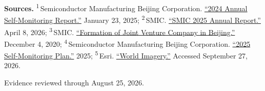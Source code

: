 \begin{minipage}[t][0.90\textheight][t]{\textwidth}
{\sffamily\scriptsize\setlength{\emergencystretch}{1.5em}\textbf{Sources.} \textsuperscript{1}\,Semiconductor Manufacturing Beijing Corporation. \href{\detokenize{https://www.smics.com/uploads/6795f77a/}\%\detokenize{26e8}\%\detokenize{2687}\%\detokenize{26aa}\%\detokenize{26e8}\%\detokenize{26a1}\%\detokenize{268c}\%\detokenize{26e7}\%\detokenize{269b}\%\detokenize{2691}\%\detokenize{26e6}\%\detokenize{26b5}\%\detokenize{268b}\%\detokenize{26e5}\%\detokenize{26b9}\%\detokenize{26b4}\%\detokenize{26e5}\%\detokenize{26ba}\%\detokenize{26a6}\%\detokenize{26e6}\%\detokenize{268a}\%\detokenize{26a5}\%\detokenize{26e5}\%\detokenize{2691}\%\detokenize{268a2024}\%\detokenize{26e5}\%\detokenize{26b9}\%\detokenize{26b4.pdf}}{\enquote{2024 Annual Self-Monitoring Report.}} January 23, 2025; \textsuperscript{2}\,SMIC. \href{\detokenize{https://www1.hkexnews.hk/listedco/listconews/sehk/2026/0408/2026040801181.pdf}}{\enquote{SMIC 2025 Annual Report.}} April 8, 2026; \textsuperscript{3}\,SMIC. \href{\detokenize{https://www1.hkexnews.hk/listedco/listconews/sehk/2020/1204/2020120401701.pdf}}{\enquote{Formation of Joint Venture Company in Beijing.}} December 4, 2020; \textsuperscript{4}\,Semiconductor Manufacturing Beijing Corporation. \href{\detokenize{https://www.smics.com/uploads/2025}\%\detokenize{26e5}\%\detokenize{26b9}\%\detokenize{26b4}\%\detokenize{26e8}\%\detokenize{2687}\%\detokenize{26aa}\%\detokenize{26e8}\%\detokenize{26a1}\%\detokenize{268c}\%\detokenize{26e7}\%\detokenize{269b}\%\detokenize{2691}\%\detokenize{26e6}\%\detokenize{26b5}\%\detokenize{268b}\%\detokenize{26e6}\%\detokenize{2696}\%\detokenize{26b9}\%\detokenize{26e6}\%\detokenize{26a1}\%\detokenize{2688.pdf}}{\enquote{2025 Self-Monitoring Plan.}} 2025; \textsuperscript{5}\,Esri. \href{\detokenize{https://www.arcgis.com/home/item.html?id=10df2279f9684e4a9f6a7f08febac2a9}}{\enquote{World Imagery.}} Accessed September 27, 2026.\par}
\vfill
\noindent{\color{hairline}\rule{\linewidth}{0.4pt}}\par\smallskip
{\sffamily\scriptsize\color{black!58} Evidence reviewed through August 25, 2026.\par}
\end{minipage}
\clearpage
